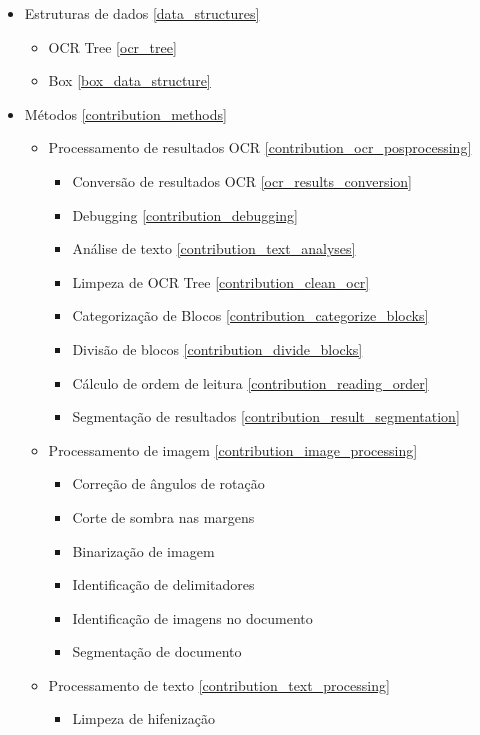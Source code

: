 \begin{itemize}\setlength\itemsep{-0.3em}
	\item Estruturas de dados \ref{data_structures}
	\begin{itemize}\setlength\itemsep{-0.3em}
		\item OCR Tree \ref{ocr_tree}
		\item Box \ref{box_data_structure}
	\end{itemize}
	\item Métodos \ref{contribution_methods}
	
	\begin{itemize}\setlength\itemsep{-0.3em}
		\item Processamento de resultados OCR \ref{contribution_ocr_posprocessing}
		
		\begin{itemize}\setlength\itemsep{-0.3em}
			\item Conversão de resultados OCR \ref{ocr_results_conversion}
			\item Debugging \ref{contribution_debugging}
			\item Análise de texto \ref{contribution_text_analyses}
			\item Limpeza de OCR Tree \ref{contribution_clean_ocr}
			\item Categorização de Blocos \ref{contribution_categorize_blocks}
			\item Divisão de blocos \ref{contribution_divide_blocks}
			\item Cálculo de ordem de leitura \ref{contribution_reading_order}
			\item Segmentação de resultados \ref{contribution_result_segmentation}
		\end{itemize}
		
		\item Processamento de imagem \ref{contribution_image_processing}
		\begin{itemize}\setlength\itemsep{-0.3em}
			\item Correção de ângulos de rotação
			\item Corte de sombra nas margens
			\item Binarização de imagem
			\item Identificação de delimitadores
			\item Identificação de imagens no documento
			\item Segmentação de documento
		\end{itemize}
		
		\item Processamento de texto \ref{contribution_text_processing}
		\begin{itemize}\setlength\itemsep{-0.3em}
			\item Limpeza de hifenização
		\end{itemize}
		
		
	\end{itemize}
\end{itemize}


